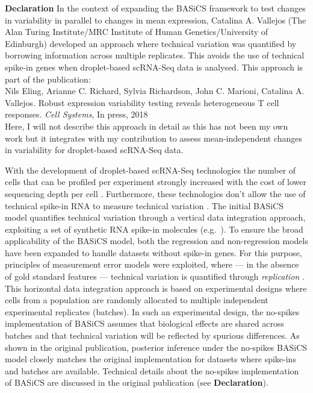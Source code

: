 \begin{Comment}
\textbf{Declaration} In the context of expanding the BASiCS framework to test changes in variability in parallel to changes in mean expression, Catalina A. Vallejos (The Alan Turing Institute/MRC Institute of Human Genetics/University of Edinburgh) developed an approach where technical variation was quantified by borrowing information across multiple replicates. This avoids the use of technical spike-in genes when droplet-based scRNA-Seq data is analysed. This approach is part of the publication:\\

Nils Eling, Arianne C. Richard, Sylvia Richardson, John C. Marioni, Catalina A. Vallejos. Robust expression variability testing reveals heterogeneous T cell responses. \emph{Cell Systems}, In press, 2018 \\

Here, I will not describe this approach in detail as this has not been my own work but it integrates with my contribution to assess mean-independent changes in variability for droplet-based scRNA-Seq data.
\end{Comment}

With the development of droplet-based scRNA-Seq technologies the number of cells that can be profiled per experiment strongly increased with the cost of lower sequencing depth per cell \citep{Macosko2015, Klein2015, Zheng2017}. Furthermore, these technologies don't allow the use of technical spike-in RNA to measure technical variation \citep{Brennecke2013}. The initial BASiCS model \citep{Vallejos2015BASiCS, Vallejos2016} quantifies technical variation through a vertical data integration approach, exploiting a set of synthetic RNA spike-in molecules (e.g.~\citep{Jiang2011}). To ensure the broad applicability of the BASiCS model, both the regression and non-regression models have been expanded to 
handle datasets without spike-in genes. For this purpose, principles of measurement error models were exploited, where --- in the absence of gold standard features --- technical variation is quantified through {\it replication} \citep{Carroll1998}. This horizontal data integration approach is based on experimental designs where cells from a population are randomly allocated to multiple independent experimental replicates (batches). In such an experimental design, the no-spikes implementation of BASiCS assumes that biological effects are shared across batches and that technical variation will be reflected by spurious differences.  As shown in the original publication, posterior inference under the no-spikes BASiCS model closely matches the original implementation for datasets where spike-ins and batches are available. Technical details about the no-spikes implementation of BASiCS are discussed in the original publication (see \textbf{Declaration}).

